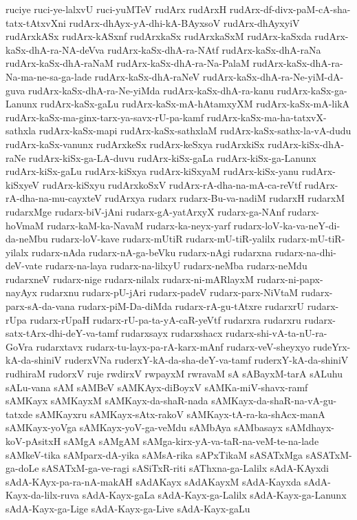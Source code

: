 {ruciye
ruci-ye-lalxvU
ruci-yuMTeV
rudArx
rudArxH
rudArx-df-divx-paM-cA-sha-tatx-tAtxvXni
rudArx-dhAyx-yA-dhi-kA-BAyxsoV
rudArx-dhAyxyiV
rudArxkASx
rudArx-kASxnf
rudArxkaSx
rudArxkaSxM
rudArx-kaSxda
rudArx-kaSx-dhA-ra-NA-deVva
rudArx-kaSx-dhA-ra-NAtf
rudArx-kaSx-dhA-raNa
rudArx-kaSx-dhA-raNaM
rudArx-kaSx-dhA-ra-Na-PalaM
rudArx-kaSx-dhA-ra-Na-ma-ne-sa-ga-lade
rudArx-kaSx-dhA-raNeV
rudArx-kaSx-dhA-ra-Ne-yiM-dA-guva
rudArx-kaSx-dhA-ra-Ne-yiMda
rudArx-kaSx-dhA-ra-kanu
rudArx-kaSx-ga-Lanunx
rudArx-kaSx-gaLu
rudArx-kaSx-mA-hAtamxyXM
rudArx-kaSx-mA-likA
rudArx-kaSx-ma-ginx-tarx-ya-savx-rU-pa-kamf
rudArx-kaSx-ma-ha-tatxvX-sathxla
rudArx-kaSx-mapi
rudArx-kaSx-sathxlaM
rudArx-kaSx-sathx-la-vA-dudu
rudArx-kaSx-vanunx
rudArxkeSx
rudArx-keSxya
rudArxkiSx
rudArx-kiSx-dhA-raNe
rudArx-kiSx-ga-LA-duvu
rudArx-kiSx-gaLa
rudArx-kiSx-ga-Lanunx
rudArx-kiSx-gaLu
rudArx-kiSxya
rudArx-kiSxyaM
rudArx-kiSx-yanu
rudArx-kiSxyeV
rudArx-kiSxyu
rudArxkoSxV
rudArx-rA-dha-na-mA-ca-reVtf
rudArx-rA-dha-na-mu-cayxteV
rudArxya
rudarx
rudarx-Bu-va-nadiM
rudarxH
rudarxM
rudarxMge
rudarx-biV-jAni
rudarx-gA-yatArxyX
rudarx-ga-NAnf
rudarx-hoVmaM
rudarx-kaM-ka-NavaM
rudarx-ka-neyx-yarf
rudarx-loV-ka-va-neY-di-da-neMbu
rudarx-loV-kave
rudarx-mUtiR
rudarx-mU-tiR-yalilx
rudarx-mU-tiR-yilalx
rudarx-nAda
rudarx-nA-ga-beVku
rudarx-nAgi
rudarxna
rudarx-na-dhi-deV-vate
rudarx-na-laya
rudarx-na-lilxyU
rudarx-neMba
rudarx-neMdu
rudarxneV
rudarx-nige
rudarx-nilalx
rudarx-ni-mARlayxM
rudarx-ni-papx-nayAyx
rudarxnu
rudarx-pU-jAri
rudarx-padeV
rudarx-parx-NiVtaM
rudarx-parx-sA-da-vana
rudarx-piM-Da-diMda
rudarx-rA-gu-tAtxre
rudarxrU
rudarx-rUpa
rudarx-rUpaH
rudarx-rU-pa-ta-yA-caR-yeVtf
rudarxra
rudarxru
rudarx-satx-tArx-dhi-deY-va-tamf
rudarxsayx
rudarxshacx
rudarx-shi-vA-ta-nU-ra-GoVra
rudarxtavx
rudarx-tu-layx-pa-rA-karx-mAnf
rudarx-veV-sheyxyo
rudeYrx-kA-da-shiniV
ruderxVNa
ruderxY-kA-da-sha-deY-va-tamf
ruderxY-kA-da-shiniV
rudhiraM
rudorxV
ruje
rwdirxV
rwpayxM
rwravaM
sA
sABayxM-tarA
sALuhu
sALu-vana
sAM
sAMBeV
sAMKAyx-diBoyxV
sAMKa-miV-shavx-ramf
sAMKayx
sAMKayxM
sAMKayx-da-shaR-nada
sAMKayx-da-shaR-na-vA-gu-tatxde
sAMKayxru
sAMKayx-sAtx-rakoV
sAMKayx-tA-ra-ka-shAcx-manA
sAMKayx-yoVga
sAMKayx-yoV-ga-veMdu
sAMbAya
sAMbasayx
sAMdhayx-koV-pAsitxH
sAMgA
sAMgAM
sAMga-kirx-yA-va-taR-na-veM-te-na-lade
sAMkeV-tika
sAMparx-dA-yika
sAMsA-rika
sAPxTikaM
sASATxMga
sASATxM-ga-doLe
sASATxM-ga-ve-ragi
sASiTxR-riti
sAThxna-ga-Lalilx
sAdA-KAyxdi
sAdA-KAyx-pa-ra-nA-makAH
sAdAKayx
sAdAKayxM
sAdA-Kayxda
sAdA-Kayx-da-lilx-ruva
sAdA-Kayx-gaLa
sAdA-Kayx-ga-Lalilx
sAdA-Kayx-ga-Lanunx
sAdA-Kayx-ga-Lige
sAdA-Kayx-ga-Live
sAdA-Kayx-gaLu
}
